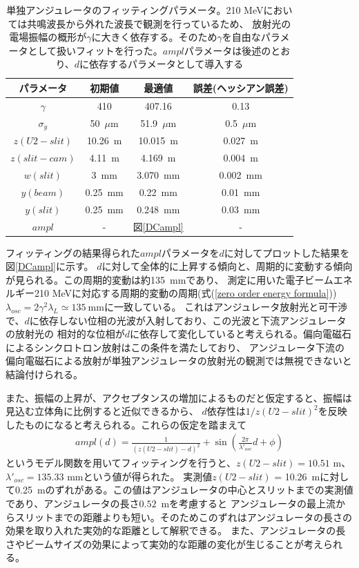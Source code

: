 \documentclass[a4paper,11pt,uplatex]{jsbook}
\begin{document}
\begin{table}
  \centering
  \begin{tabular}{c|c|cc}
    パラメータ & 初期値 & 最適値 & 誤差(ヘッシアン誤差)\\ \hline
    $\gamma$  & 410        & 407.16 & 0.13\\
    $\sigma_y$ & 50~$\mu$m & 51.9~$\mu$m& 0.5~$\mu$m\\
    $z(U2-slit)$ & 10.26~m & 10.015~m & 0.027~m\\
    $z(slit-cam)$ & 4.11~m & 4.169~m & 0.004~m\\
    $w(slit)$ & 3~mm       & 3.070~mm& 0.002~mm\\
    $y(beam)$ & 0.25~mm    & 0.22~mm& 0.01~mm\\
    $y(slit)$ & 0.25~mm    & 0.248~mm&0.03~mm \\
    $ampl$ & -             &図\ref{DCampl}&-\\
  \end{tabular}
  \caption[単独アンジュレータのフィッティングパラメータ]{単独アンジュレータのフィッティングパラメータ。210 MeVにおいては共鳴波長から外れた波長で観測を行っているため、
  放射光の電場振幅の概形が$\gamma$に大きく依存する。そのため$\gamma$を自由なパラメータとして扱いフィットを行った。$ampl$パラメータは後述のとおり、$d$に依存するパラメータとして導入する} 
  \label{tab:single_prm}
\end{table}

フィッティングの結果得られた$ampl$パラメータを$d$に対してプロットした結果を図\ref{DCampl}に示す。
$d$に対して全体的に上昇する傾向と、周期的に変動する傾向が見られる。この周期的変動は約135~mmであり、
測定に用いた電子ビームエネルギー210 MeVに対応する周期的変動の周期(式(\ref{zero order energy formula}))$\lambda_{osc} = 2\gamma^2\lambda_L \simeq 135~\text{mm}$に一致している。
これはアンジュレータ放射光と可干渉で、$d$に依存しない位相の光波が入射しており、この光波と下流アンジュレータの放射光の
相対的な位相が$d$に依存して変化していると考えられる。偏向電磁石によるシンクロトロン放射はこの条件を満たしており、
アンジュレータ下流の偏向電磁石による放射が単独アンジュレータの放射光の観測では無視できないと結論付けられる。

また、振幅の上昇が、アクセプタンスの増加によるものだと仮定すると、振幅は見込む立体角に比例すると近似できるから、
$d$依存性は$1/z(U2-slit)^2$を反映したものになると考えられる。これらの仮定を踏まえて
\begin{eqnarray}
  ampl(d) = \frac{1}{(z(U2-slit) -d)^2} + \sin\left( \frac{2\pi}{\lambda'_{osc}}d + \phi \right)\label{eq:ampl}
\end{eqnarray}
というモデル関数を用いてフィッティングを行うと、$z(U2-slit) = 10.51$ m、$\lambda'_{osc}= 135.33$ mmという値が得られた。
実測値$z(U2-slit)$ = 10.26~mに対して0.25~mのずれがある。この値はアンジュレータの中心とスリットまでの実測値であり、アンジュレータの長さ$0.52$~mを考慮すると
アンジュレータの最上流からスリットまでの距離よりも短い。そのためこのずれはアンジュレータの長さの効果を取り入れた実効的な距離として解釈できる。
また、アンジュレータの長さやビームサイズの効果によって実効的な距離の変化が生じることが考えられる。
\end{document}
